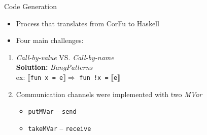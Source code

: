 \documentclass[unknownkeysallowed]{beamer}
\begin{document}
\begin{frame}[fragile]{Code Generation}
  \begin{itemize}
  \item Process that translates from CorFu to Haskell
  \item Four main challenges:
  \end{itemize}
  \begin{enumerate}
    \item \textit{Call-by-value} VS. \textit{Call-by-name}\\
      \textbf{Solution:} \textit{BangPatterns}\\      
      ex: $\llbracket$\lstinline|fun x = e|$\rrbracket \Rightarrow$ \lstinline|fun !x =| $\llbracket$\lstinline|e|$\rrbracket$ 
    \newline
    \item Communication channels were implemented with two \textit{MVar}      
   \begin{itemize}
   \item \lstinline[Haskell]|putMVar| -- \lstinline|send|
   \item \lstinline[Haskell]|takeMVar| -- \lstinline|receive|
   \end{itemize}
  \end{enumerate}
\end{frame}
\end{document}
